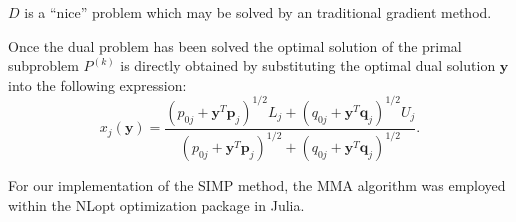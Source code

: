 $D$ is a ``nice'' problem which may be solved by an traditional gradient method.

Once the dual problem has been solved the optimal solution of the primal subproblem $P^{(k)}$ is directly obtained by substituting the optimal dual solution $\mathbf{y}$ into the following expression:
$$x_j(\mathbf{y})=\frac{\left(p_{0j}+\mathbf{y}^T\mathbf{p}_j\right)^{1/2}L_j+\left(q_{0j}+\mathbf{y}^T\mathbf{q}_j\right)^{1/2}U_j}{\left(p_{0j}+\mathbf{y}^T\mathbf{p}_j\right)^{1/2}+\left(q_{0j}+\mathbf{y}^T\mathbf{q}_j\right)^{1/2}}.$$

For our implementation of the SIMP method, the MMA algorithm was employed within the NLopt optimization package in Julia.